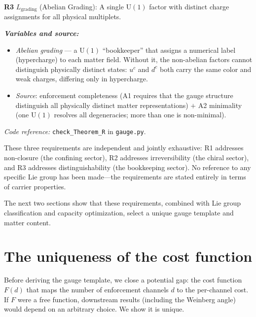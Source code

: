 \documentclass[11pt]{article}
\newenvironment{varlist}{\begin{itemize}[nosep,leftmargin=2em]}{\end{itemize}}
\newcommand{\coderef}[2]{\smallskip\noindent\textit{Code reference:} \texttt{#1} in \texttt{#2}.}
\newcommand{\U}{\mathrm{U}}
\begin{document}
\begin{tcolorbox}[apfbox, title={Theorem R: Representation Requirements from Admissibility}]
\medskip
\textbf{R3} $L_{\mathrm{grading}}$ (Abelian Grading): A single $\U(1)$ factor with distinct charge assignments for all physical multiplets.

\smallskip\noindent\textbf{\textit{Variables and source:}}
\begin{varlist}
\item \textit{Abelian grading} --- a $\U(1)$ ``bookkeeper'' that assigns a numerical label (hypercharge) to each matter field.  Without it, the non-abelian factors cannot distinguish physically distinct states: $u^c$ and $d^c$ both carry the same color and weak charges, differing only in hypercharge.
\item \textit{Source}: enforcement completeness (A1 requires that the gauge structure distinguish all physically distinct matter representations) $+$ A2 minimality (one $\U(1)$ resolves all degeneracies; more than one is non-minimal).
\end{varlist}

\coderef{check\_Theorem\_R}{gauge.py}
\end{tcolorbox}


These three requirements are independent and jointly exhaustive: R1 addresses non-closure (the confining sector), R2 addresses irreversibility (the chiral sector), and R3 addresses distinguishability (the bookkeeping sector).  No reference to any specific Lie group has been made---the requirements are stated entirely in terms of carrier properties.

The next two sections show that these requirements, combined with Lie group classification and capacity optimization, select a unique gauge template and matter content.



\section{The uniqueness of the cost function}
\label{sec:cauchy}

Before deriving the gauge template, we close a potential gap: the cost function $F(d)$ that maps the number of enforcement channels $d$ to the per-channel cost.  If $F$ were a free function, downstream results (including the Weinberg angle) would depend on an arbitrary choice.  We show it is unique.
\end{document}
